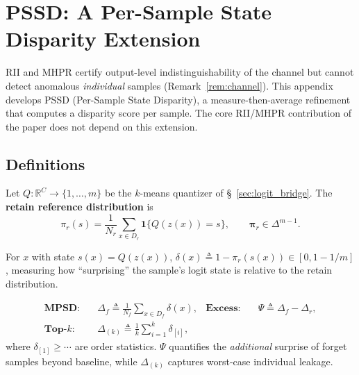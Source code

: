 \documentclass[smallextended]{svjour3}       %
\newcommand{\coloneqq}{\triangleq}
\begin{document}
\appendix
\section{PSSD: A Per-Sample State Disparity Extension}
\label{app:pssd}

RII and MHPR certify output-level indistinguishability of the channel but cannot detect anomalous \emph{individual} samples (Remark~\ref{rem:channel}). This appendix develops PSSD (Per-Sample State Disparity), a measure-then-average refinement that computes a disparity score per sample. The core RII/MHPR contribution of the paper does not depend on this extension.

\subsection{Definitions}

Let $Q:\mathbb{R}^C\to\{1,\dots,m\}$ be the $k$-means quantizer of \S\ \ref{sec:logit_bridge}. The \textbf{retain reference distribution} is
\begin{equation}
\pi_r(s) = \frac{1}{N_r}\sum_{x\in D_r}\mathbf{1}\{Q(z(x))=s\}, \qquad \boldsymbol{\pi}_r\in\Delta^{m-1}.
\end{equation}

\begin{definition}
\label{def:isd}
For $x$ with state $s(x)=Q(z(x))$, $\delta(x)\coloneqq 1-\pi_r(s(x))\in[0,1-1/m]$, measuring how ``surprising'' the sample's logit state is relative to the retain distribution.
\end{definition}

\begin{definition}
\label{def:pssd_agg}
\begin{align}
\textbf{MPSD:}\quad &\Delta_f \coloneqq \frac{1}{N_f}\sum_{x\in D_f}\delta(x), &
\textbf{Excess:}\quad &\Psi \coloneqq \Delta_f - \Delta_r,\\
\textbf{Top-$k$:}\quad &\Delta_{(k)} \coloneqq \frac{1}{k}\sum_{i=1}^k\delta_{[i]},
\end{align}
where $\delta_{[1]}\ge\cdots$ are order statistics. $\Psi$ quantifies the \emph{additional} surprise of forget samples beyond baseline, while $\Delta_{(k)}$ captures worst-case individual leakage.
\end{definition}
\end{document}
